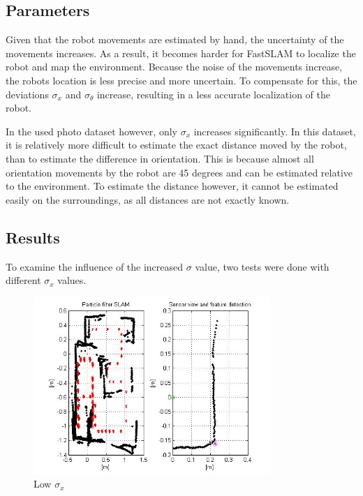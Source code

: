 \documentclass[12pt]{article}
\begin{document}
\subsection{Parameters}
Given that the robot movements are estimated by hand, the uncertainty of the movements increases. As a result, it becomes harder for FastSLAM to localize the robot and map the environment. Because the noise of the movements increase, the robots location is less precise and more uncertain. To compensate for this, the deviations $\sigma_x$ and $\sigma_\theta$ increase, resulting in a less accurate localization of the robot.

In the used photo dataset however, only $\sigma_x$ increases significantly. In this dataset, it is relatively more difficult to estimate the exact distance moved by the robot, than to estimate the difference in orientation. This is because almost all orientation movements by the robot are 45 degrees and can be estimated relative to the environment. To estimate the distance however, it cannot be estimated easily on the surroundings, as all distances are not exactly known.

\subsection{Results}
To examine the influence of the increased $\sigma$ value, two tests were done with different $\sigma_x$ values.

\begin{figure}[H]
	\centering
	\includegraphics[width=0.8\textwidth]{own_normal.jpg}
	\caption{Low $\sigma_x$}
\end{figure}
\end{document}
